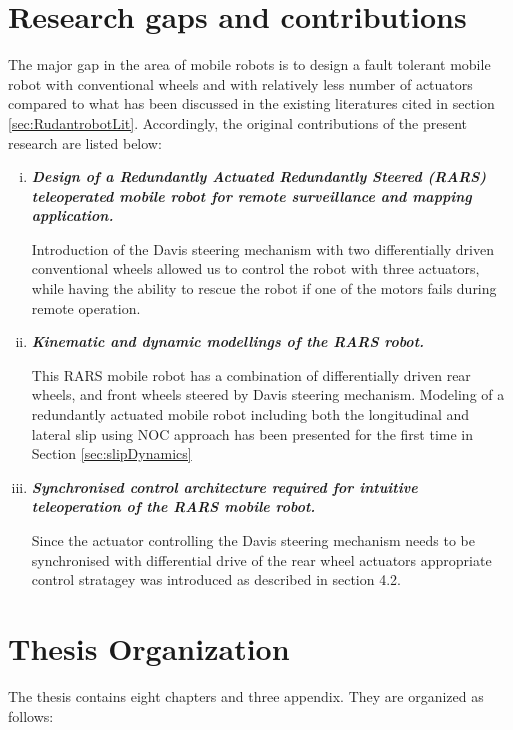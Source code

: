 \section{Research gaps and  contributions}
The major gap in the area of mobile robots is to design a fault tolerant mobile robot with conventional wheels and with relatively less number of actuators compared to what has been discussed in the existing literatures cited in section \ref{sec:RudantrobotLit}. Accordingly, the original contributions of the present research are listed below:
\begin{enumerate}[(i)]

\item \textbf{\textit{Design of a Redundantly Actuated Redundantly Steered (RARS)  teleoperated mobile robot for remote surveillance and mapping application.}}

   Introduction of the Davis steering mechanism \cite{TOMBook} with two differentially  driven  conventional wheels allowed us to control the robot with three actuators, while having the ability to rescue the robot if one of the motors fails during remote operation.
		
 
	
\item \textbf{\textit{ Kinematic and dynamic modellings of the RARS robot.}}

 This RARS mobile robot  has a combination of differentially driven rear wheels, and front wheels steered by  Davis steering mechanism.  Modeling of a redundantly actuated mobile robot  including both the longitudinal and lateral slip using NOC approach has  been presented for the first time in Section \ref{sec:slipDynamics}  
	   
\item \textbf{\textit{Synchronised control architecture required for intuitive teleoperation of the RARS mobile robot.}} 

Since the actuator controlling the Davis steering mechanism needs to be synchronised with differential drive of the rear wheel actuators appropriate control stratagey was introduced as described in section 4.2.




\end{enumerate}
\section{Thesis Organization}
The thesis contains eight chapters and three appendix. They are organized as follows:
